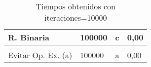 \documentclass{article}
\begin{document}
\begin{table}[h]
\begin{tabular}{llll}
			\multicolumn{1}{|l|}{\multirow{-3}{*}{R. Binaria}}         & \multicolumn{1}{l|}{\multirow{-3}{*}{100000}}            & \multicolumn{1}{l|}{c}                                    & \multicolumn{1}{l|}{0,00}                                        \\ \hline
			&                                                          &                                                           &                                                                  \\ \hline
			\multicolumn{1}{|l|}{Evitar Op. Ex. (a)}                   & \multicolumn{1}{l|}{100000}                              & \multicolumn{1}{l|}{a}                                    & \multicolumn{1}{l|}{0,00}                                        \\ \hline
		\end{tabular}
	\caption{Tiempos obtenidos con iteraciones=10000}
	\end{table}
	
\end{document}
